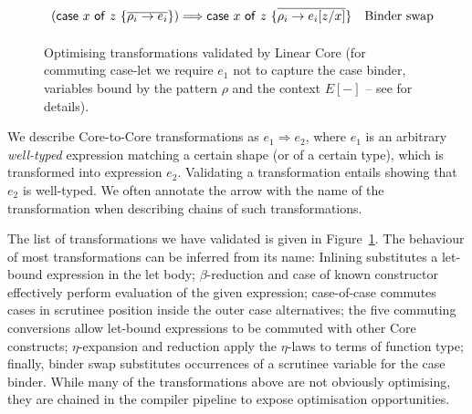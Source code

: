 \documentclass[acmsmall,review,screen]{acmart}
\newcommand{\ccase}[2]{\mathsf{case}~#1~\mathsf{of}~#2}
\begin{document}
\begin{figure}[t]
{\[\begin{array}{ll}
      (\ccase{x}{z~\{\ov{\rho_i\to e_i}\}}) \Longrightarrow \ccase{x}{z~\{\ov{\rho_i\to  e_i[z/x]}\}}
                                                                      & \mbox{Binder swap}\\[1ex]
    \end{array}
  \]}
  \caption{Optimising transformations validated by Linear
    Core\label{fig:opttrans} (for commuting case-let we
      require $e_1$ not to capture the case binder, variables bound by the
      pattern $\rho$ and the context $E[{-}]$ -- see \cite{techreport} for
    details).} 
\end{figure}





We describe Core-to-Core transformations as $e_1 \Longrightarrow e_2$,
where $e_1$ is an arbitrary \emph{well-typed} expression
matching a certain shape (or of a certain type), which is
transformed into expression $e_2$. Validating a transformation
entails showing that $e_2$ is well-typed. We often annotate the arrow
with the name of the transformation when describing chains of such
transformations.

The list of transformations we have
validated is given in Figure~\ref{fig:opttrans}.
%
The behaviour of most transformations can be inferred from its name:
Inlining substitutes a let-bound expression in the let body; $\beta$-reduction
and case of known constructor effectively perform evaluation of the given expression;
case-of-case commutes cases in scrutinee position inside the outer case alternatives;
the five commuting conversions allow let-bound expressions to be commuted with other
Core constructs; $\eta$-expansion and reduction apply the $\eta$-laws to terms of function type;
finally, binder swap substitutes occurrences of a scrutinee variable for the
case binder. While many of the transformations above are not obviously optimising,
they are chained in the compiler pipeline to expose optimisation opportunities.


\end{document}
